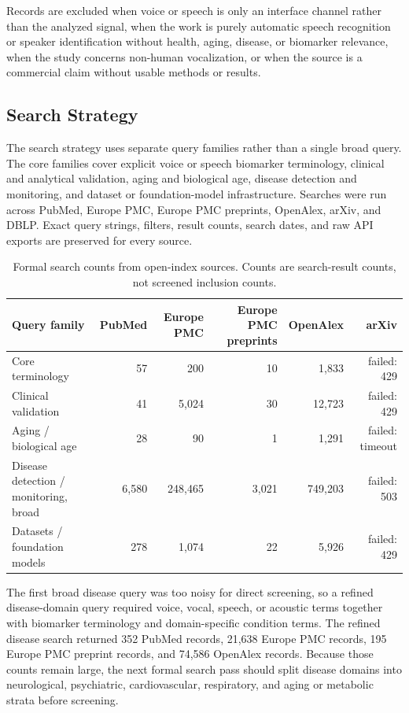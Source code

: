 \documentclass[11pt]{article}
\begin{document}
Records are excluded when voice or speech is only an interface channel rather than the analyzed signal, when the work is purely automatic speech recognition or speaker identification without health, aging, disease, or biomarker relevance, when the study concerns non-human vocalization, or when the source is a commercial claim without usable methods or results.

\subsection{Search Strategy}

The search strategy uses separate query families rather than a single broad query. The core families cover explicit voice or speech biomarker terminology, clinical and analytical validation, aging and biological age, disease detection and monitoring, and dataset or foundation-model infrastructure. Searches were run across PubMed, Europe PMC, Europe PMC preprints, OpenAlex, arXiv, and DBLP. Exact query strings, filters, result counts, search dates, and raw API exports are preserved for every source.

\begin{table}[htbp]
\centering
\caption{Formal search counts from open-index sources. Counts are search-result counts, not screened inclusion counts.}
\small
\begin{tabular}{lrrrrr}
\toprule
Query family & PubMed & Europe PMC & Europe PMC preprints & OpenAlex & arXiv \\
\midrule
Core terminology & 57 & 200 & 10 & 1,833 & failed: 429 \\
Clinical validation & 41 & 5,024 & 30 & 12,723 & failed: 429 \\
Aging / biological age & 28 & 90 & 1 & 1,291 & failed: timeout \\
Disease detection / monitoring, broad & 6,580 & 248,465 & 3,021 & 749,203 & failed: 503 \\
Datasets / foundation models & 278 & 1,074 & 22 & 5,926 & failed: 429 \\
\bottomrule
\end{tabular}
\end{table}

The first broad disease query was too noisy for direct screening, so a refined disease-domain query required voice, vocal, speech, or acoustic terms together with biomarker terminology and domain-specific condition terms. The refined disease search returned 352 PubMed records, 21,638 Europe PMC records, 195 Europe PMC preprint records, and 74,586 OpenAlex records. Because those counts remain large, the next formal search pass should split disease domains into neurological, psychiatric, cardiovascular, respiratory, and aging or metabolic strata before screening.
\end{document}

